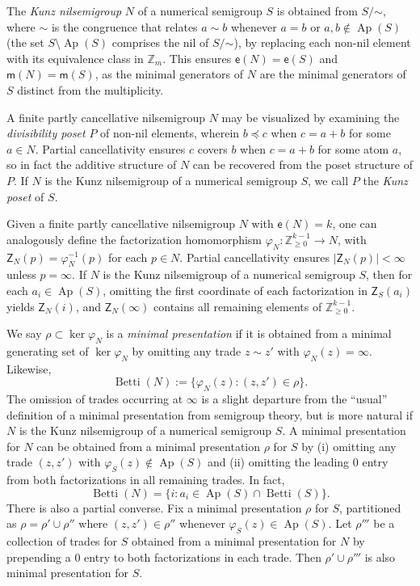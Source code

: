 \documentclass[10pt,a4paper]{amsart}
\newcommand\ZZ{\mathbb{Z}}
\newcommand\til{\mathord\sim}
\DeclareMathOperator\Betti{Betti}
\DeclareMathOperator\Ap{Ap}
\begin{document}
The \emph{Kunz nilsemigroup} $N$ of a numerical semigroup $S$ is obtained from $S/\til$, where $\til$ is the congruence that relates $a \sim b$ whenever $a = b$ or $a, b \notin \Ap(S)$ (the set $S \setminus \Ap(S)$ comprises the nil of $S/\til$), by replacing each non-nil element with its equivalence class in $\ZZ_m$.  This ensures $\mathsf e(N) = \mathsf e(S)$ and $\mathsf m(N) = \mathsf m(S)$, as the minimal generators of $N$ are the minimal generators of $S$ distinct from the multiplicity.  

A finite partly cancellative nilsemigroup $N$ may be visualized by examining the \emph{divisibility poset} $P$ of non-nil elements, wherein $b \preceq c$ when $c = a + b$ for some $a \in N$.  Partial cancellativity ensures $c$ covers $b$ when $c = a + b$ for some atom $a$, so in fact the additive structure of $N$ can be recovered from the poset structure of $P$.  If $N$ is the Kunz nilsemigroup of a numerical semigroup $S$, we call $P$ the \emph{Kunz poset} of $S$.  

Given a finite partly cancellative nilsemigroup $N$ with $\mathsf e(N) = k$, one can analogously define the factorization homomorphism $\varphi_N:\ZZ_{\ge 0}^{k-1} \to N$, with $\mathsf Z_N(p) = \varphi_N^{-1}(p)$ for each $p \in N$.  Partial cancellativity ensures $|\mathsf Z_N(p)| < \infty$ unless $p = \infty$.  
If $N$ is the Kunz nilsemigroup of a numerical semigroup $S$, then for each $a_i \in \Ap(S)$, omitting the first coordinate of each factorization in $\mathsf Z_S(a_i)$ yields $\mathsf Z_N(i)$, and $\mathsf Z_N(\infty)$ contains all remaining elements of $\ZZ_{\ge 0}^{k-1}$.  

We say $\rho \subset \ker\varphi_N$ is a \emph{minimal presentation} if it is obtained from a minimal generating set of $\ker\varphi_N$ by omitting any trade $z \sim z'$ with $\varphi_N(z) = \infty$.  Likewise, 
$$\Betti(N) := \{\varphi_N(z) : (z, z') \in \rho\}.$$
The omission of trades occurring at $\infty$ is a slight departure from the ``usual'' definition of a minimal presentation from semigroup theory, but is more natural if $N$ is the Kunz nilsemigroup of a numerical semigroup $S$.  A minimal presentation for $N$ can be obtained from a minimal presentation $\rho$ for $S$ by (i) omitting any trade $(z, z')$ with $\varphi_S(z) \notin \Ap(S)$ and (ii) omitting the leading 0 entry from both factorizations in all remaining trades.  In fact, $$\Betti(N) = \{i : a_i \in \Ap(S) \cap \Betti(S)\}.$$
There is also a partial converse.  Fix a minimal presentation $\rho$ for $S$, partitioned as $\rho = \rho' \cup \rho''$ where $(z, z') \in \rho''$ whenever $\varphi_S(z) \in \Ap(S)$.  Let $\rho'''$ be a collection of trades for $S$ obtained from a minimal presentation for $N$ by prepending a 0 entry to both factorizations in each trade.  Then $\rho' \cup \rho'''$ is also minimal presentation for $S$.  
\end{document}
